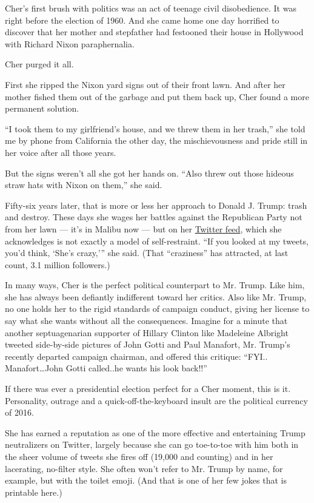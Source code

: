 Cher's first brush with politics was an act of teenage civil
disobedience. It was right before the election of 1960. And she came
home one day horrified to discover that her mother and stepfather had
festooned their house in Hollywood with Richard Nixon paraphernalia.

Cher purged it all.

First she ripped the Nixon yard signs out of their front lawn. And after
her mother fished them out of the garbage and put them back up, Cher
found a more permanent solution.

``I took them to my girlfriend's house, and we threw them in her
trash,'' she told me by phone from California the other day, the
mischievousness and pride still in her voice after all those years.

But the signs weren't all she got her hands on. ``Also threw out those
hideous straw hats with Nixon on them,'' she said.

Fifty-six years later, that is more or less her approach to Donald J.
Trump: trash and destroy. These days she wages her battles against the
Republican Party not from her lawn --- it's in Malibu now --- but on her
\href{https://twitter.com/cher?ref_src=twsrc\%5Egoogle\%7Ctwcamp\%5Eserp\%7Ctwgr\%5Eauthor}{Twitter
feed}, which she acknowledges is not exactly a model of self-restraint.
``If you looked at my tweets, you'd think, `She's crazy,''' she said.
(That ``craziness'' has attracted, at last count, 3.1 million
followers.)

In many ways, Cher is the perfect political counterpart to Mr. Trump.
Like him, she has always been defiantly indifferent toward her critics.
Also like Mr. Trump, no one holds her to the rigid standards of campaign
conduct, giving her license to say what she wants without all the
consequences. Imagine for a minute that another septuagenarian supporter
of Hillary Clinton like Madeleine Albright tweeted side-by-side pictures
of John Gotti and Paul Manafort, Mr. Trump's recently departed campaign
chairman, and offered this critique: ``FYI.. Manafort\ldots{}John Gotti
called..he wants his look back!!''

If there was ever a presidential election perfect for a Cher moment,
this is it. Personality, outrage and a quick-off-the-keyboard insult are
the political currency of 2016.

She has earned a reputation as one of the more effective and
entertaining Trump neutralizers on Twitter, largely because she can go
toe-to-toe with him both in the sheer volume of tweets she fires off
(19,000 and counting) and in her lacerating, no-filter style. She often
won't refer to Mr. Trump by name, for example, but with the toilet
emoji. (And that is one of her few jokes that is printable here.)

